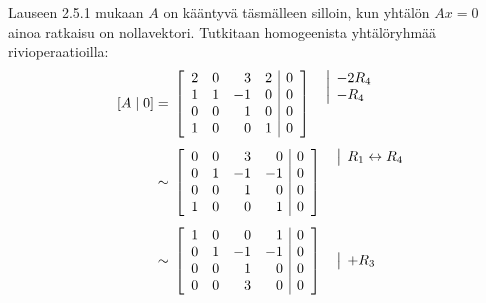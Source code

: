 \documentclass[11pt,a4paper]{amsart}
\begin{document}
\begin{solution}
  Lauseen 2.5.1 mukaan \(A\) on kääntyvä täsmälleen silloin,
  kun yhtälön \(Ax=0\) ainoa ratkaisu on nollavektori.
  Tutkitaan homogeenista yhtälöryhmää rivioperaatioilla:
  \[
    \begin{aligned}
      [A\mid 0] &={}
      \left[
        \begin{array}{rrrr|r}
          2 & 0 & 3 & 2 & 0 \\
          1 & 1 & -1 & 0 & 0 \\
          0 & 0 & 1 & 0 & 0 \\
          1 & 0 & 0 & 1 & 0
        \end{array}
      \right]
      \quad
      \begin{array}{@{}l@{}}
        \smash{\rowop{-2R_4}} \\
        \smash{\rowop{-R_4}} \\
        {} \\
        {}
      \end{array}
      \\[1ex]
      &\sim{}
      \left[
        \begin{array}{rrrr|r}
          0 & 0 & 3 & 0 & 0 \\
          0 & 1 & -1 & -1 & 0 \\
          0 & 0 & 1 & 0 & 0 \\
          1 & 0 & 0 & 1 & 0
        \end{array}
      \right]
      \quad
      \begin{array}{@{}l@{}}
        \smash{\rowop{R_1\leftrightarrow R_4}} \\
        {} \\
        {} \\
        {}
      \end{array}
      \\[1ex]
      &\sim{}
      \left[
        \begin{array}{rrrr|r}
          1 & 0 & 0 & 1 & 0 \\
          0 & 1 & -1 & -1 & 0 \\
          0 & 0 & 1 & 0 & 0 \\
          0 & 0 & 3 & 0 & 0
        \end{array}
      \right]
      \quad
      \begin{array}{@{}l@{}}
        {} \\
        \smash{\rowop{+R_3}} \\
        {} \\

\end{array}
\end{aligned}\]
\end{solution}
\end{document}
